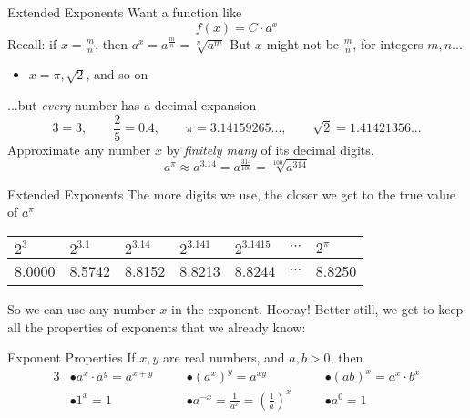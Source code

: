 \documentclass[]{beamer}
\begin{document}
	\begin{frame}{Extended Exponents}
		Want a function like
		\begin{equation*}
			f(x) = C\cdot a^x
		\end{equation*}
		\pause
		Recall: if $x = \frac{m}{n}$, then $a^x = a^\frac{m}{n} = \sqrt[n]{a^m}$
		\pause
		\vfill
		But $x$ might not be $\frac{m}{n}$, for integers $m,n$...
		\pause\vfill
		\begin{itemize}
			\item $x = \pi, \sqrt{2}$, and so on
		\end{itemize}
		\pause
		\vfill
		...but \textit{every} number has a decimal expansion
		\begin{equation*}
			3 = 3, \qquad \frac{2}{5} = 0.4, \qquad \pi=3.14159265..., \qquad \sqrt{2} = 1.41421356...
		\end{equation*}
		\pause\vfill
		Approximate any number $x$ by \textit{finitely many} of its decimal digits.
		\begin{equation*}
			a^\pi \approx a^{3.14} = a^{\frac{314}{100}} = \sqrt[100]{a^{314}}
		\end{equation*}
	\end{frame}

	\begin{frame}{Extended Exponents}
		The more digits we use, the closer we get to the true value of $a^\pi$
		\vfill
		\begin{center}
		\begin{tabular}{@{}lllllcl@{}}
			$2^3$ & $2^{3.1}$ & $2^{3.14}$ & $2^{3.141}$ & $2^{3.1415}$ & $\cdots$ & $2^\pi$\\
			\midrule
			8.0000 & 8.5742 & 8.8152 & 8.8213 & 8.8244 & $\cdots$ & 8.8250
		\end{tabular}
		\end{center}
		\pause
		\vfill
		So we can use any number $x$ in the exponent. Hooray!
		\pause
		\vfill
		Better still, we get to keep all the properties of exponents that we already know:
		\begin{block}{Exponent Properties}
			If $x,y$ are real numbers, and $a,b > 0$, then
			\begin{alignat*}{3}
				&\bullet a^x\cdot a^y = a^{x+y} &\quad &\bullet \left(a^x\right)^y = a^{xy} &\quad &\bullet (ab)^x = a^x\cdot b^x \\
				&\bullet 1^x = 1 &\quad &\bullet a^{-x} = \frac{1}{a^x} = \left(\frac{1}{a}\right)^x &\quad &\bullet a^0 = 1
			\end{alignat*}
		\end{block}
	\end{frame}
	
\end{document}
